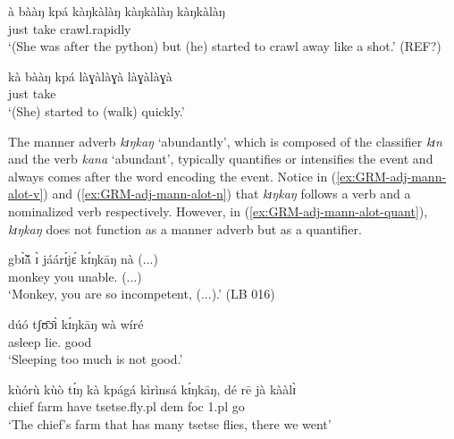 \begin{exe}
\begin{exe}
\begin{exe}


\ea\label{ex:GRM-adj-mann-ideo-adv}


\ea\label{ex:GRM-adj-mann-ideo}
\gll à bààŋ kpá {kàŋkàlàŋ kàŋkàlàŋ kàŋkàlàŋ}\\
{\conn} just take crawl.rapidly\\
\glt `(She was after the python) but (he) started to crawl away like a shot.' 
(REF?)

\ex\label{ex:GRM-adj-mann-adv}
\gll  kà bààŋ kpá làɣàlàɣà làɣàlàɣà\\
{\conn} just take {\dxm} {\dxm}\\
\glt `(She) started to (walk) quickly.'


\z 
 \z


The manner adverb {\it kɪŋkaŋ} `abundantly',  which is composed of the 
classifier
{\it kɪn} and the verb {\it kana} `abundant',  typically quantifies or 
intensifies
the
event and always comes after the word encoding the event.  Notice in
(\ref{ex:GRM-adj-mann-alot-v})  and (\ref{ex:GRM-adj-mann-alot-n})   that {\it 
kɪŋkaŋ} follows a verb and a nominalized verb respectively. However, in
(\ref{ex:GRM-adj-mann-alot-quant}), {\it kɪŋkaŋ} does not function as a
manner adverb but as a quantifier.



\ea\label{ex:GRM-adj-mann-alot}

\ea\label{ex:GRM-adj-mann-alot-v}
\gll gbɪ̃̀ã́           ɪ̀       jáárɪ́jɛ́        kɪ́ŋkāŋ       nà
(...)\\ 
monkey   you     unable.{\pfv}     {\dxm} {\foc} (...)\\
\glt `Monkey, you are so incompetent, (...).' (LB 016)

\ex\label{ex:GRM-adj-mann-alot-n}

\gll dúó tʃʊ̄ɔ̄ɪ̀ kɪ́ŋkāŋ wà wíré\\
asleep lie.{\nmlz} {\dxm} {\neg} good\\
\glt `Sleeping too much is not good.'

\ex\label{ex:GRM-adj-mann-alot-quant}
\gll kùórù   kùò    tɪ́ŋ   kà   kpágá kìrìnsá  kɪ́ŋkāŋ, dé rē jà 
kààlɪ̀\\
 chief farm {\art} {\rel} have tsetse.fly.{\sc pl}  {\quant} {\sc dem} {\sc 
foc} {\sc 1.pl} go\\
\glt   `The chief's farm that has  many tsetse flies, there we went' 


\z 
 \z




\end{exe}
\end{exe}
\end{exe}
